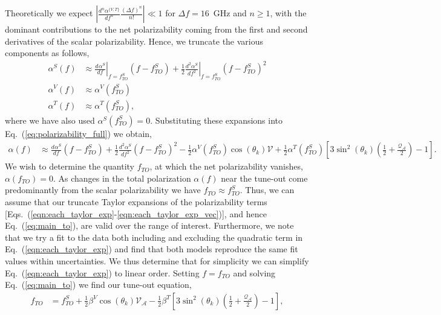 \documentclass[%
 amsmath,amssymb,
aps,
]{revtex4-2}
\newcommand{\derivn}[3][{}]{
    \frac{d^{#1} #2}{d #3^{#1}}
}
\newcommand{\difn}[3]{\frac{d^#3 #1}{d #2^#3}}
\begin{document}
Theoretically we expect \(\left|\difn{\alpha^{\{V,T\}}}{f}{n} \frac{(\Delta f)^n}{n!}\right|\ll 1\) for \(\Delta f = 16\)~GHz and \(n\geq1\), with the dominant contributions to the net polarizability coming from the first and second derivatives of the scalar polarizability. Hence, we truncate the various components as follows,
\begin{align}
    \alpha^S(f) &\approx \left. \derivn{\alpha^S}{f}{{}}\right|_{f=f^{S}_{TO}} (f-f^{S}_{TO}) +\frac{1}{2}\left. \difn{\alpha^S}{f}{2}\right|_{f=f^{S}_{TO}}(f-f^{S}_{TO})^2 \label{eqn:each_taylor_exp}\\
    \alpha^V(f) &\approx  \alpha^V(f^{S}_{TO}) \\
    \alpha^T(f) &\approx  \alpha^T(f^{S}_{TO}),\label{eqn:each_taylor_exp_vec}
\end{align}
where we have also used \( \alpha^S(f^{S}_{TO})=0\). Substituting these expansions into Eq.~(\ref{eq:polarizability_full}) we obtain,
\begin{align}
    \alpha(f) &\approx \derivn{\alpha^S}{f}{{}}(f-f^{S}_{TO}) + \frac{1}{2} \difn{\alpha^S}{f}{2} (f-f^{S}_{TO})^2
    -\frac{1}{2} \alpha^V(f^{S}_{TO}) \cos \left( \theta_k \right) \mathcal{V}  + 
    \frac{1}{2} \alpha^T(f^{S}_{TO}) \left[3 \sin^2\left( \theta_k \right) \left(\frac{1}{2} +  \frac{\mathcal{Q_{A}}}{2}\right) -1 \right]  . \label{eq:main_to}
\end{align}
We wish to determine the quantity \(f_{TO}\), at which the net polarizability vanishes, \(\alpha(f_{TO})=0\). As changes in the total polarization \(\alpha(f)\) near the tune-out come predominantly from the scalar polarizability we have \(f_{TO}\approx f^{S}_{TO}\). Thus, we can assume that our truncate Taylor expansions of the polarizability terms [Eqs.~(\ref{eqn:each_taylor_exp}-\ref{eqn:each_taylor_exp_vec})], and hence Eq.~(\ref{eq:main_to}), are valid over the range of interest. Furthermore, we note that we try a fit to the data both including and excluding the quadratic term in Eq.~(\ref{eqn:each_taylor_exp}) and find that both models reproduce the same fit values within uncertainties. We thus determine that for simplicity we can simplify Eq.~(\ref{eqn:each_taylor_exp}) to linear order. Setting \(f=f_{TO}\) and solving Eq.~(\ref{eq:main_to}) we find our tune-out equation, 
 \begin{align}
    f_{TO} &= 
    f^{S}_{TO}
    +\frac{1}{2}\beta^V  \cos \left( \theta_k \right) \mathcal{V_{A}}
    - \frac{1}{2}\beta^T  \left[3 \sin^2\left( \theta_k \right) \left(\frac{1}{2} +  \frac{\mathcal{Q_{A}}}{2}\right) -1 \right], \label{eqn:tune_out_eq} 
\end{align}
\end{document}
